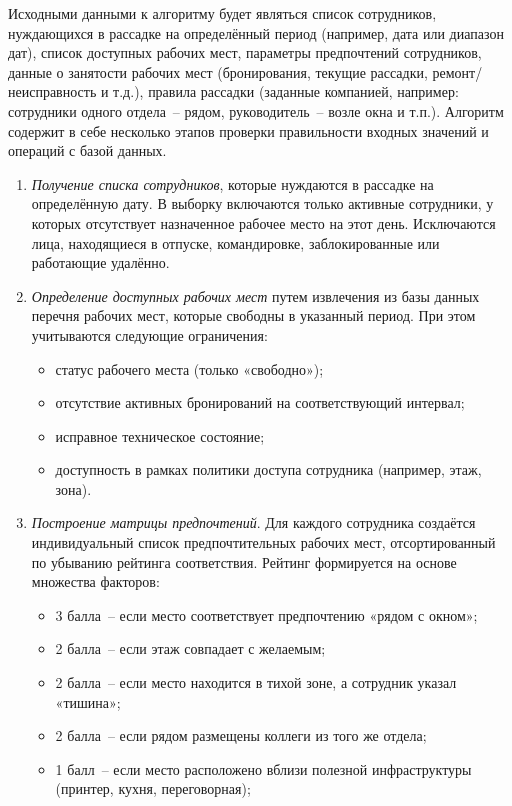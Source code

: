 Исходными данными к алгоритму будет являться список сотрудников, нуждающихся в рассадке на определённый период (например, дата или диапазон дат), список доступных рабочих мест, параметры предпочтений сотрудников, данные о занятости рабочих мест (бронирования, текущие рассадки, ремонт/неисправность и т.д.), правила рассадки (заданные компанией, например: сотрудники одного отдела~-- рядом, руководитель~-- возле окна и т.п.). Алгоритм содержит в себе несколько этапов проверки правильности входных значений и операций с базой данных.

\begin{enumerate}
    \item \textit{Получение списка сотрудников}, которые нуждаются в рассадке на определённую дату. В выборку включаются только активные сотрудники, у которых отсутствует назначенное рабочее место на этот день. Исключаются лица, находящиеся в отпуске, командировке, заблокированные или работающие удалённо.
    \item \textit{Определение доступных рабочих мест} путем извлечения из базы данных перечня рабочих мест, которые свободны в указанный период. При этом учитываются следующие ограничения:
    \begin{itemize}
        \item статус рабочего места (только «свободно»);
        \item отсутствие активных бронирований на соответствующий интервал;
        \item исправное техническое состояние;
        \item доступность в рамках политики доступа сотрудника (например, этаж, зона).
    \end{itemize}
    \item \textit{Построение матрицы предпочтений}. Для каждого сотрудника создаётся индивидуальный список предпочтительных рабочих мест, отсортированный по убыванию рейтинга соответствия. Рейтинг формируется на основе множества факторов:
    \begin{itemize}
        \item 3 балла~-- если место соответствует предпочтению «рядом с окном»;
        \item 2 балла~-- если этаж совпадает с желаемым;
        \item 2 балла~-- если место находится в тихой зоне, а сотрудник указал «тишина»;
        \item 2 балла~-- если рядом размещены коллеги из того же отдела;
        \item 1 балл~-- если место расположено вблизи полезной инфраструктуры (принтер, кухня, переговорная);

\end{itemize}
\end{enumerate}
